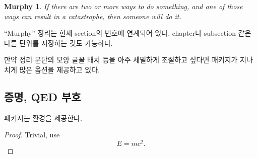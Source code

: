 \begin{example}
\newtheorem{mur}{Murphy}[section]

\begin{mur} If there are two or 
more ways to do something, and 
one of those ways can result in
a catastrophe, then someone 
will do it.\end{mur}
\end{example}


``Murphy'' 정리는 현재 section의 번호에 연계되어 있다. chapter나 subsection 같은 다른 단위를 지정하는 것도 가능하다.

만약 정리 문단의 모양 글꼴 배치 등을 아주 세밀하게 조절하고 싶다면
 패키지가 지나치게 많은 옵션을 제공하고 있다.

\subsection{증명, QED 부호}
\label{sec:putting-qed-right}

 패키지는  환경을 제공한다.

\begin{example}
\begin{proof}
 Trivial, use
 \begin{equation*}
   E=mc^2.
 \end{equation*}
\end{proof}
\end{example}

